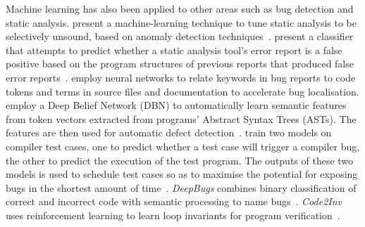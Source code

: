 Machine learning has also been applied to other areas such as bug detection and static analysis.
\citeauthor{Heo2017} present a machine-learning technique to tune static analysis to be selectively unsound, based on anomaly detection techniques~\cite{Heo2017}.
\citeauthor{Koc2017} present a classifier that attempts to predict whether a static analysis tool's error report is a false positive based on the program structures of previous reports that produced false error reports~\cite{Koc2017}.
\citeauthor{Lam2016} employ neural networks to relate keywords in bug reports to code tokens and terms in source files and documentation to accelerate bug localisation.
\citeauthor{Wang2016c} employ a Deep Belief Network (DBN) to automatically learn semantic features from token vectors extracted from programs' Abstract Syntax Trees (ASTs). The features are then used for automatic defect detection~\cite{Wang2016c}.
\citeauthor{Chen2017} train two models on compiler test cases, one to predict whether a test case will trigger a compiler bug, the other to predict the execution of the test program. The outputs of these two models is used to schedule test cases so as to maximise the potential for exposing bugs in the shortest amount of time~\cite{Chen2017}.
\emph{DeepBugs} combines binary classification of correct and incorrect code with semantic processing to name bugs~\cite{Pradel2018}.
\emph{Code2Inv} uses reinforcement learning to learn loop invariants for program verification~\cite{Si2018}.

